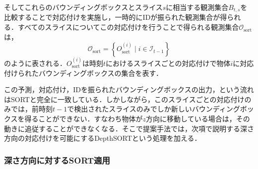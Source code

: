         そしてこれらのバウンディングボックスとスライス$s$に相当する観測集合$B_{t,s}$を比較することで対応付けを実施し，一時的にIDが振られた観測集合が得られる．すべてのスライスについてこの対応付けを行うことで得られる観測集合$\mathcal{O}_{\text{sort}}$は，
        \begin{equation}
            \label{eq:sort_identified_bboxes}
            \mathcal{O}_{\text{sort}} = \left\{O_{\text{sort}}^{(i)} \mid i \in \mathcal{I}_{t-1}\right\}
        \end{equation}
        のように表される．$O_{\text{sort}}^{(i)}$は時刻$t$におけるスライスごとの対応付けで物体$i$に対応付けられたバウンディングボックスの集合を表す．
        
        この予測，対応付け，IDを振られたバウンディングボックスの出力，という流れはSORTと完全に一致している．しかしながら，このスライスごとの対応付けのみでは，前時刻$t-1$で検出されたスライスのみでしか新しいバウンディングボックスを得ることができない．すなわち物体が$z$方向に移動している場合は，その動きに追従することができなくなる．そこで提案手法では，次項で説明する深さ方向の対応付けを可能にするDepthSORTという処理を加える．

        \subsubsection{深さ方向に対するSORT適用}
        \label{subsubsec:depth_directional_matching}

